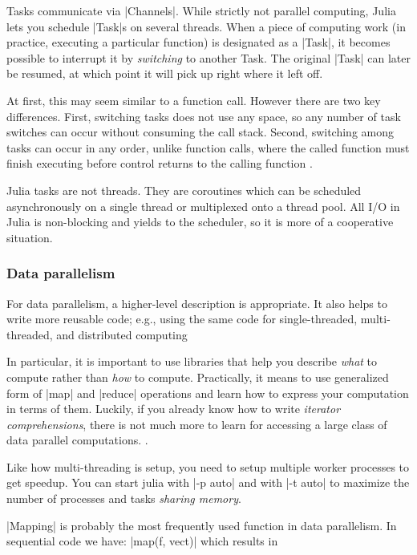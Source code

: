 Tasks communicate via |Channels|. While strictly not parallel computing, Julia lets you schedule |Task|s on several threads. When a piece of computing work (in practice, executing a particular function) is designated as a |Task|, it becomes possible to interrupt it by \emph{switching} to another Task. The original |Task| can later be resumed, at which point it will pick up right where it left off. 

At first, this may seem similar to a function call. However there are two key differences. First, switching tasks does not use any space, so any number of task switches can occur without consuming the call stack. Second, switching among tasks can occur in any order, unlike function calls, where the called function must finish executing before control returns to the calling function \cite{julia:parallel:data-parallelism}.

Julia tasks are not threads. They are coroutines which can be scheduled asynchronously on a single thread or multiplexed onto a thread pool. All I/O in Julia is non-blocking and yields to the scheduler, so it is more of a cooperative situation.


\subsubsection*{Data parallelism}

For data parallelism, a higher-level description is appropriate. It also helps to write more reusable code; e.g., using the same code for single-threaded, multi-threaded, and distributed computing

In particular, it is important to use libraries that help you describe \emph{what} to compute rather than \emph{how} to compute. Practically, it means to use generalized form of |map| and |reduce| operations and learn how to express your computation in terms of them. Luckily, if you already know how to write \emph{iterator comprehensions}, there is not much more to learn for accessing a large class of data parallel computations. \cite{julia:parallel:data-parallelism}. 

Like how multi-threading is setup, you need to setup multiple worker processes to get speedup. You can start julia with |-p auto| and with |-t auto| to maximize the number of processes and tasks \emph{sharing memory}.

|Mapping| is probably the most frequently used function in data parallelism. 
In sequential code we have: |map(f, vect)| which results in 

